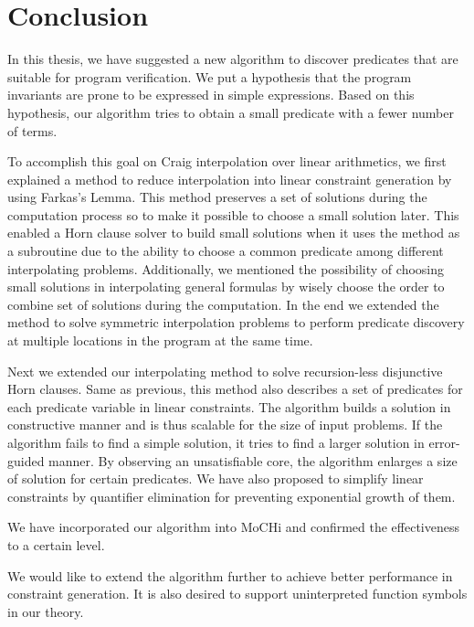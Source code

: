 \chapter{Conclusion}
\label{chap:conclusion}

In this thesis, we have suggested a new algorithm to discover
predicates that are suitable for program verification.  We put a
hypothesis that the program invariants are prone to be expressed in
simple expressions.  Based on this hypothesis, our algorithm tries to
obtain a small predicate with a fewer number of terms.

To accomplish this goal on Craig interpolation over linear
arithmetics, we first explained a method to reduce interpolation into
linear constraint generation by using Farkas's Lemma.  This method
preserves a set of solutions during the computation process so to make
it possible to choose a small solution later. This enabled a Horn
clause solver to build small solutions when it uses the method as a
subroutine due to the ability to choose a common predicate among
different interpolating problems. Additionally, we mentioned the
possibility of choosing small solutions in interpolating general
formulas by wisely choose the order to combine set of solutions during
the computation. In the end we extended the method to solve symmetric
interpolation problems to perform predicate discovery at multiple
locations in the program at the same time.

Next we extended our interpolating method to solve recursion-less
disjunctive Horn clauses.  Same as previous, this method also
describes a set of predicates for each predicate variable in linear
constraints.  The algorithm builds a solution in constructive manner
and is thus scalable for the size of input problems. If the algorithm
fails to find a simple solution, it tries to find a larger solution in
error-guided manner.  By observing an unsatisfiable core, the
algorithm enlarges a size of solution for certain predicates.  We have
also proposed to simplify linear constraints by quantifier elimination
for preventing exponential growth of them.

We have incorporated our algorithm into MoCHi and confirmed the
effectiveness to a certain level.

We would like to extend the algorithm further to achieve better
performance in constraint generation.  It is also desired to support
uninterpreted function symbols in our theory.
